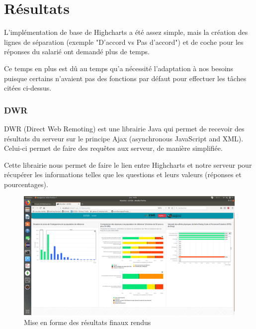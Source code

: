\section{Résultats}

L'implémentation de base de Highcharts a été assez simple, mais la création des lignes de séparation (exemple "D'accord vs Pas d'accord") et de coche pour les réponses du salarié ont demandé plus de temps. 

Ce temps en plus est dû au temps qu'a nécessité l'adaptation à nos besoins puisque certains n'avaient pas des fonctions par défaut pour effectuer les tâches citées ci-dessus.

\subsubsection{DWR}

DWR (Direct Web Remoting) est une librairie Java qui permet de recevoir des résultats du serveur sur le principe Ajax (asynchronous JavaScript and XML). Celui-ci permet de faire des requêtes aux serveur, de manière simplifiée.

Cette librairie nous permet de faire le lien entre Highcharts et notre serveur pour récupérer les informations telles que les questions et leurs valeurs (réponses et pourcentages).

\begin{figure}[H]
    \begin{center}
    \includegraphics[scale=0.2,trim=2.8cm 0.1cm 0.8cm 5.3cm, clip=true]{img/resultat}
    \end{center}
    \caption{Mise en forme des résultats finaux rendus }
\end{figure}